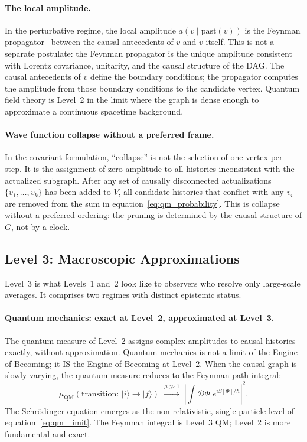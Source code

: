 \documentclass[11pt,a4paper]{article}
\theoremstyle{plain}
\theoremstyle{definition}
\theoremstyle{remark}
\newcommand{\muC}{\mu_{\mathrm{QM}}}   %
\begin{document}
\paragraph{The local amplitude.}
In the perturbative regime, the local amplitude $a(v \mid \mathrm{past}(v))$
is the Feynman propagator~\citep{Feynman1948} between the causal antecedents of $v$ and $v$ itself.
This is not a separate postulate: the Feynman propagator is the unique
amplitude consistent with Lorentz covariance, unitarity, and the causal
structure of the DAG. The causal antecedents of $v$ define the boundary
conditions; the propagator computes the amplitude from those boundary conditions
to the candidate vertex. Quantum field theory is Level~2 in the limit where
the graph is dense enough to approximate a continuous spacetime background.

\paragraph{Wave function collapse without a preferred frame.}
In the covariant formulation, ``collapse'' is not the selection of one vertex
per step. It is the assignment of zero amplitude to all histories inconsistent
with the actualized subgraph. After any set of causally disconnected
actualizations $\{v_1, \ldots, v_k\}$ has been added to $V$, all candidate
histories that conflict with any $v_i$ are removed from the sum in
equation~\eqref{eq:qm_probability}. This is collapse without a preferred
ordering: the pruning is determined by the causal structure of $G$, not by
a clock.

\subsection{Level 3: Macroscopic Approximations}

Level~3 is what Levels~1 and~2 look like to observers who resolve
only large-scale averages. It comprises two regimes with distinct
epistemic status.

\paragraph{Quantum mechanics: exact at Level~2, approximated at Level~3.}
The quantum measure of Level~2 assigns complex amplitudes to causal histories
exactly, without approximation. Quantum mechanics is not a limit of the
Engine of Becoming; it IS the Engine of Becoming at Level~2. When the causal
graph is slowly varying, the quantum measure reduces to the Feynman path
integral:
\begin{equation}
  \muC(\text{transition: } |i\rangle \to |f\rangle)
  \;\xrightarrow{\mu \gg 1}\;
  \left|\int \mathcal{D}\Phi\; e^{iS[\Phi]/\hbar}\right|^2.
  \label{eq:qm_limit}
\end{equation}
The Schr\"{o}dinger equation emerges as the non-relativistic, single-particle
level of equation~\eqref{eq:qm_limit}. The Feynman integral is Level~3 QM;
Level~2 is more fundamental and exact.
\end{document}
